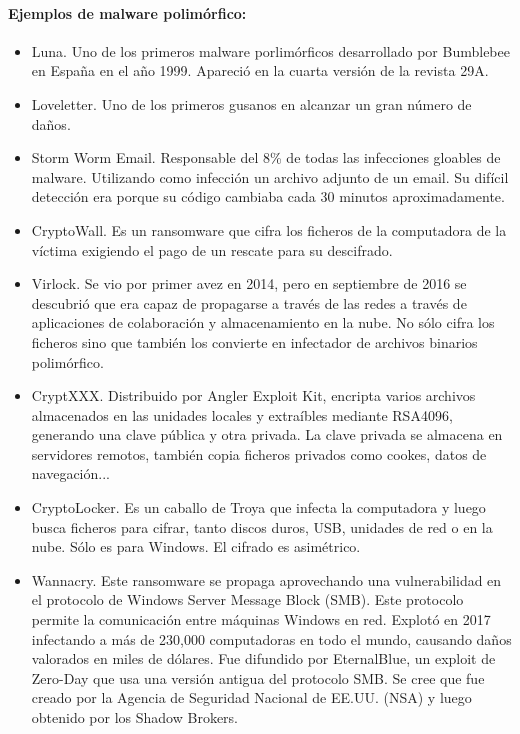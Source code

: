 \documentclass[15pt]{article}
\begin{document}
	\paragraph{Ejemplos de malware polimórfico:} 
	\begin{itemize}
		\item Luna. Uno de los primeros malware porlimórficos desarrollado por Bumblebee en España en el año 1999. Apareció en la cuarta versión de la revista 29A. \cite{luna}
		\item Loveletter. Uno de los primeros gusanos en alcanzar un gran número de daños.\cite{loveletter}
		\item Storm Worm Email. Responsable del 8\% de todas las infecciones gloables de malware. Utilizando como infección un archivo adjunto de un email. Su difícil detección era porque su código cambiaba cada 30 minutos aproximadamente. \cite{stormwormemail}
		\item CryptoWall. Es un ransomware que cifra los ficheros de la computadora de la víctima exigiendo el pago de un rescate para su descifrado. \cite{cryptowall}
		\item Virlock. Se vio por primer avez en 2014, pero en septiembre de 2016 se descubrió que era capaz de propagarse a través de las redes a través de aplicaciones de colaboración y almacenamiento en la nube. No sólo cifra los ficheros sino que también los convierte en infectador de archivos binarios polimórfico. \cite{virlock}
		\item CryptXXX. Distribuido por Angler Exploit Kit, encripta varios archivos almacenados en las unidades locales y extraíbles mediante RSA4096, generando una clave pública y otra privada. La clave privada se almacena en servidores remotos, también copia ficheros privados como cookes, datos de navegación... \cite{cryptxxx}
		\item CryptoLocker. Es un caballo de Troya que infecta la computadora y luego busca ficheros para cifrar, tanto discos duros, USB, unidades de red o en la nube. Sólo es para Windows. El cifrado es asimétrico. \cite{cryptolocker}
		\item Wannacry. Este ransomware se propaga aprovechando una vulnerabilidad en el protocolo de Windows Server Message Block (SMB). Este protocolo permite la comunicación entre máquinas Windows en red. Explotó en 2017 infectando a más de 230,000 computadoras en todo el mundo, causando daños valorados en miles de dólares. Fue difundido por EternalBlue, un exploit de Zero-Day que usa una versión antigua del protocolo SMB. Se cree que fue creado por la Agencia de Seguridad Nacional de EE.UU. (NSA) y luego obtenido por los Shadow Brokers. \cite{wannacry}
	\end{itemize}
	
\end{document}
